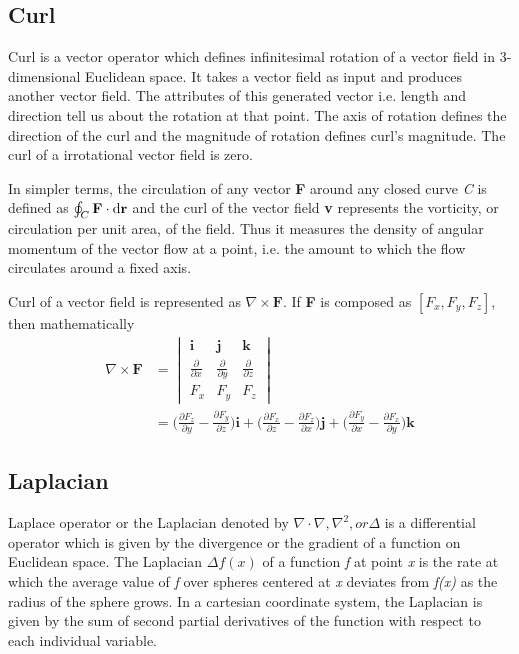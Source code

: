 \subsection{Curl}
Curl is a vector operator which defines infinitesimal rotation of a vector field in 3-dimensional Euclidean space. It takes a vector field as input and produces another vector field. The attributes of this generated vector i.e. length and direction tell us about the rotation at that point. The axis of rotation defines the direction of the curl and the magnitude of rotation defines curl's magnitude. The curl of a irrotational vector field is zero. 

In simpler terms, the circulation of any vector \textbf{F} around any closed curve \textit{C} is defined as $ \oint_C \textbf{F} \cdot \mathop{}\!\mathrm{d} \textbf{r}  $ and the curl of the vector field \textbf{v} represents the vorticity, or circulation per unit area, of the field. Thus it measures the density of angular momentum of the vector flow at a point, i.e. the amount to which the flow circulates around a fixed axis.

Curl of a vector field is represented as $ \nabla \times \textbf{F} $. If \textbf{F} is composed as $ [F_{x}, F_{y}, F_{z}] $, then mathematically
\begin{equation}
\begin{split}
	\nabla \times \textbf{F} & = 
	\begin{vmatrix}
	\textbf{i} & \textbf{j} & \textbf{k} \\
	\frac{\partial}{\partial x} & \frac{\partial}{\partial y} & \frac{\partial}{\partial z} \\
	F_{x} & F_{y} & F_{z}
	\end{vmatrix} \\
	& =  \bigg( \frac{\partial F_{z}}{\partial y} - \frac{\partial F_{y}}{\partial z} \bigg) \textbf{i} +  \bigg( \frac{\partial F_{x}}{\partial z} - \frac{\partial F_{z}}{\partial x} \bigg) \textbf{j} +  \bigg( \frac{\partial F_{y}}{\partial x} - \frac{\partial F_{x}}{\partial y} \bigg) \textbf{k}
\end{split}
\end{equation}

\subsection{Laplacian}
Laplace operator or the Laplacian denoted by $ \nabla \cdot \nabla, \nabla^{2}, or \Delta $ is a differential operator which is given by the divergence or the gradient of a function on Euclidean space. The Laplacian $ \Delta f(x) $ of a function \textit{f} at point \textit{x} is the rate at which the average value of \textit{f} over spheres centered at \textit{x} deviates from \textit{f(x)} as the radius of the sphere grows. In a cartesian coordinate system, the Laplacian is given by the sum of second partial derivatives of the function with respect to each individual variable. 

